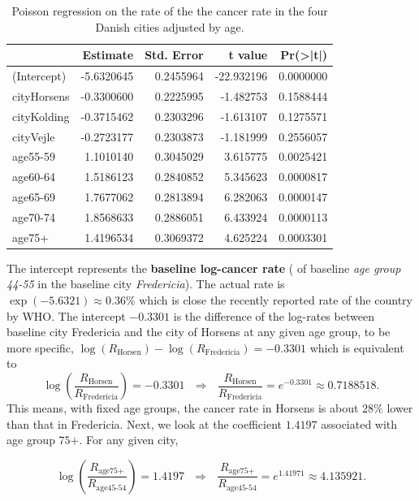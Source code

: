 \documentclass[
]{book}
\begin{document}
\begin{table}

\caption{\label{tab:unnamed-chunk-145}Poisson regression on the rate of the  the cancer rate in the four Danish cities adjusted by age.}
\centering
\begin{tabular}[t]{l|r|r|r|r}
\hline
  & Estimate & Std. Error & t value & Pr(>|t|)\\
\hline
(Intercept) & -5.6320645 & 0.2455964 & -22.932196 & 0.0000000\\
\hline
cityHorsens & -0.3300600 & 0.2225995 & -1.482753 & 0.1588444\\
\hline
cityKolding & -0.3715462 & 0.2303296 & -1.613107 & 0.1275571\\
\hline
cityVejle & -0.2723177 & 0.2303873 & -1.181999 & 0.2556057\\
\hline
age55-59 & 1.1010140 & 0.3045029 & 3.615775 & 0.0025421\\
\hline
age60-64 & 1.5186123 & 0.2840852 & 5.345623 & 0.0000817\\
\hline
age65-69 & 1.7677062 & 0.2813894 & 6.282063 & 0.0000147\\
\hline
age70-74 & 1.8568633 & 0.2886051 & 6.433924 & 0.0000113\\
\hline
age75+ & 1.4196534 & 0.3069372 & 4.625224 & 0.0003301\\
\hline
\end{tabular}
\end{table}

The intercept represents the \textbf{baseline log-cancer rate} ( of baseline \emph{age group 44-55} in the baseline city \emph{Fredericia}). The actual rate is \(\exp(-5.6321) \approx 0.36\%\) which is close the recently reported rate of the country by WHO. The intercept \(-0.3301\) is the difference of the log-rates between baseline city Fredericia and the city of Horsens at any given age group, to be more specific, \(\log(R_{\text{Horsen}}) - \log(R_{\text{Fredericia}}) = -0.3301\) which is equivalent to
\[
\log \left( \frac{R_{\text{Horsen}}}{R_{\text{Fredericia}}} \right) = -0.3301 ~~~\Rightarrow~~~\frac{R_{\text{Horsen}}}{R_{\text{Fredericia}}} = e^{-0.3301} \approx 0.7188518.
\]
This means, with fixed age groups, the cancer rate in Horsens is about \(28\%\) lower than that in Fredericia. Next, we look at the coefficient \(1.4197\) associated with age group \(\text{75+}\). For any given city,

\[
\log \left(\frac{R_{\text{age75+}}}{R_{\text{age45-54}}} \right) = 1.4197~~~\Rightarrow~~~\frac{R_{\text{age75+}}}{R_{\text{age45-54}}} = e^{1.41971} \approx 4.135921. 
\]
\end{document}
